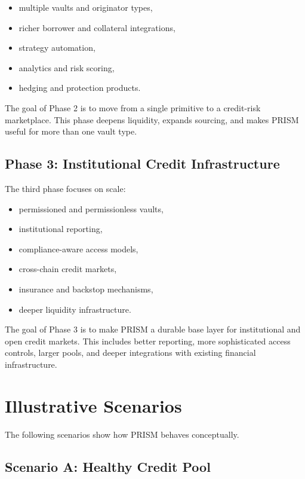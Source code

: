 \documentclass[11pt]{article}
\begin{document}
\begin{itemize}
  \item multiple vaults and originator types,
  \item richer borrower and collateral integrations,
  \item strategy automation,
  \item analytics and risk scoring,
  \item hedging and protection products.
\end{itemize}

The goal of Phase 2 is to move from a single primitive to a credit-risk
marketplace. This phase deepens liquidity, expands sourcing, and makes PRISM
useful for more than one vault type.

\subsection{Phase 3: Institutional Credit Infrastructure}

The third phase focuses on scale:

\begin{itemize}
  \item permissioned and permissionless vaults,
  \item institutional reporting,
  \item compliance-aware access models,
  \item cross-chain credit markets,
  \item insurance and backstop mechanisms,
  \item deeper liquidity infrastructure.
\end{itemize}

The goal of Phase 3 is to make PRISM a durable base layer for institutional and
open credit markets. This includes better reporting, more sophisticated access
controls, larger pools, and deeper integrations with existing financial
infrastructure.

\section{Illustrative Scenarios}

The following scenarios show how PRISM behaves conceptually.

\subsection{Scenario A: Healthy Credit Pool}
\end{document}
